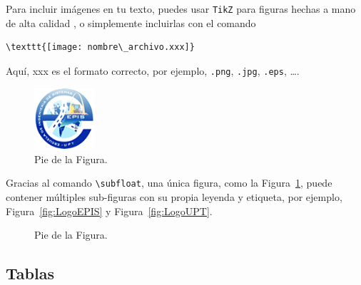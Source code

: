\documentclass[11pt,a4paper]{article}
\begin{document}
Para incluir imágenes en tu texto, puedes usar \texttt{TikZ} para figuras hechas a mano de alta calidad \cite{tikz}, o simplemente incluirlas con el comando
\begin{verbatim}
\texttt{[image: nombre\_archivo.xxx]}
\end{verbatim}
Aquí, xxx es el formato correcto, por ejemplo, \verb|.png|, \verb|.jpg|, \verb|.eps|, \dots.

\begin{figure}[H]
    \centering
    \includegraphics[width=0.2\textwidth]{LogoEPIS.png}
    \caption{Pie de la Figura.}
    \label{fig:quadtree}
\end{figure}

Gracias al comando \texttt{\textbackslash subfloat}, una única figura, como la Figura~\ref{fig:quadtree}, puede contener múltiples sub-figuras con su propia leyenda y etiqueta, por ejemplo, Figura~\ref{fig:LogoEPIS} y Figura~\ref{fig:LogoUPT}. 

\begin{figure}[H]
    \centering
    \quad
    \caption[]{Pie de la Figura.}
    \label{fig:quadtree2}
\end{figure}

\subsection{Tablas}
\label{subsec:tables}
\end{document}
